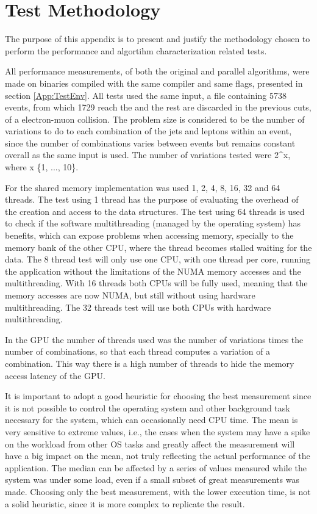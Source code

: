 \appendix
{}
\chapter{Test Methodology}
\label{App:TestMethodology}

The purpose of this appendix is to present and justify the methodology chosen to perform the performance and algortihm characterization related tests.

All performance measurements, of both the original and parallel algorithms, were made on binaries compiled with the same compiler and same flags, presented in section \ref{App:TestEnv}. All tests used the same input, a file containing 5738 events, from which 1729 reach the \ttDilepKinFit and the rest are discarded in the previous cuts, of a electron-muon collision. The problem size is considered to be the number of variations to do to each combination of the jets and leptons within an event, since the number of combinations varies between events but remains constant overall as the same input is used. The number of variations tested were 2^{x}, where x \in \{1, ..., 10\}. 

For the shared memory implementation was used 1, 2, 4, 8, 16, 32 and 64 threads. The test using 1 thread has the purpose of evaluating the overhead of the creation and access to the data structures. The test using 64 threads is used to check if the software multithreading (managed by the operating system) has benefits, which can expose problems when accessing memory, specially to the memory bank of the other CPU, where the thread becomes stalled waiting for the data. The 8 thread test will only use one CPU, with one thread per core, running the application without the limitations of the NUMA memory accesses and the multithreading. With 16 threads both CPUs will be fully used, meaning that the memory accesses are now NUMA, but still without using hardware multithreading. The 32 threads test will use both CPUs with hardware multithreading.

In the GPU the number of threads used was the number of variations times the number of combinations, so that each thread computes a variation of a combination. This way there is a high number of threads to hide the memory access latency of the GPU.

It is important to adopt a good heuristic for choosing the best measurement since it is not possible to control the operating system and other background task necessary for the system, which can occasionally need CPU time. The mean is very sensitive to extreme values, i.e., the cases when the system may have a spike on the workload from other OS tasks and greatly affect the measurement will have a big impact on the mean, not truly reflecting the actual performance of the application. The median can be affected by a series of values measured while the system was under some load, even if a small subset of great measurements was made. Choosing only the best measurement, with the lower execution time, is not a solid heuristic, since it is more complex to replicate the result.

